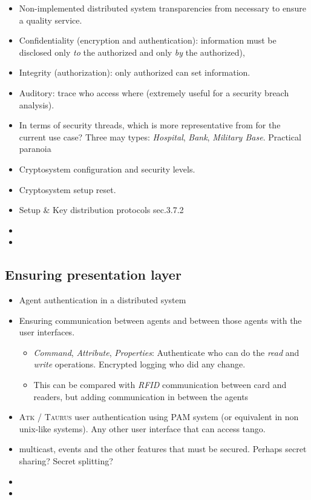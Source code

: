 \documentclass[10pt,a4paper,twoside]{llncs}
\newcommand{\taurus}{\textsc{Taurus} }
\newcommand{\atk}{\textsc{Atk} }
\begin{document}
\begin{itemize}
 \item Non-implemented distributed system transparencies from \cite{TanenbaumDistr} necessary to ensure a quality service.
 \item Confidentiality (encryption and authentication): information must be disclosed only \emph{to} the authorized and only \emph{by} the authorized),
 \item Integrity (authorization): only authorized can set information.
 \item Auditory: trace who access where (extremely useful for a security breach analysis).
 \item In terms of security threads, which is more representative from \cite{SecEngRossAnderson} for the current use case? Three may types: \emph{Hospital}, \emph{Bank}, \emph{Military Base}. Practical paranoia \cite{PractCryptoSchneier}
 \item Cryptosystem configuration and security levels.
 \item Cryptosystem setup reset.
 \item Setup \& Key distribution protocols \cite{SecEngRossAnderson} sec.3.7.2
 \item 
 \item 
\end{itemize}

%
\subsection{Ensuring presentation layer}

\begin{itemize}
 \item Agent authentication in a distributed system
 \item Ensuring communication between agents and between those agents with the user interfaces.
 \begin{itemize}
  \item \emph{Command}, \emph{Attribute}, \emph{Properties}: Authenticate who can do the \emph{read} and \emph{write} operations. Encrypted logging who did any change.
  \item This can be compared with \emph{RFID} communication between card and readers, but adding communication in between the agents
 \end{itemize}
 \item \atk/ \taurus user authentication using PAM system (or equivalent in non unix-like systems). Any other user interface that can access tango.
 \item multicast, events and the other features that must be secured. Perhaps secret sharing? Secret splitting?
 \item 
 \item 
\end{itemize}
\end{document}
